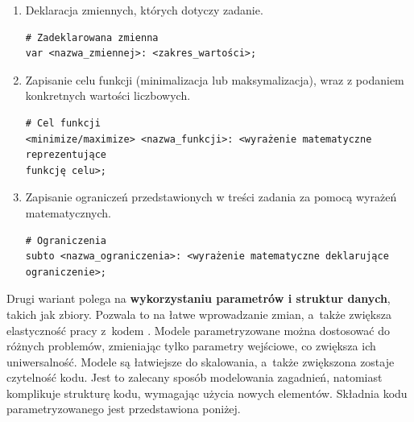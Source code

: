 \begin{enumerate}
\item Deklaracja zmiennych, których dotyczy zadanie.

\begin{lstlisting}[language=zimpl]
# Zadeklarowana zmienna
var <nazwa_zmiennej>: <zakres_wartości>;
\end{lstlisting}

\item Zapisanie celu funkcji (minimalizacja lub maksymalizacja), wraz z podaniem konkretnych wartości liczbowych.

\begin{lstlisting}[language=zimpl]
# Cel funkcji
<minimize/maximize> <nazwa_funkcji>: <wyrażenie matematyczne reprezentujące
funkcję celu>;
\end{lstlisting}

\item Zapisanie ograniczeń przedstawionych w treści zadania za pomocą wyrażeń matematycznych.

\begin{lstlisting}[language=zimpl]
# Ograniczenia
subto <nazwa_ograniczenia>: <wyrażenie matematyczne deklarujące ograniczenie>;
\end{lstlisting}
\end{enumerate}

Drugi wariant polega na \textbf{wykorzystaniu parametrów i struktur danych}, takich jak zbiory. Pozwala to na łatwe wprowadzanie zmian, a~także zwiększa elastyczność pracy z~kodem . Modele parametryzowane można dostosować do różnych problemów, zmieniając tylko parametry wejściowe, co zwiększa ich uniwersalność. Modele są łatwiejsze do skalowania, a~także zwiększona zostaje czytelność kodu. Jest to zalecany sposób modelowania zagadnień, natomiast komplikuje strukturę kodu, wymagając użycia nowych elementów. Składnia kodu parametryzowanego jest przedstawiona poniżej.

